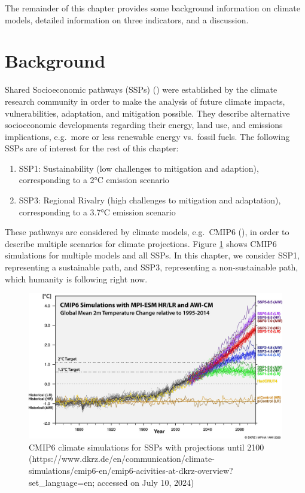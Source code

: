 \documentclass[
]{krantz}
\providecommand{\tightlist}{%
  \setlength{\itemsep}{0pt}\setlength{\parskip}{0pt}}
\begin{document}
The remainder of this chapter provides some background information on climate models, detailed information on three indicators, and a discussion.

\section{Background}\label{background}

Shared Socioeconomic pathways (SSPs) (\citet{riahi2017}) were established by the climate research community in order to make the analysis of future climate impacts, vulnerabilities, adaptation, and mitigation possible. They describe alternative socioeconomic developments regarding their energy, land use, and emissions implications, e.g.~more or less renewable energy vs.~fossil fuels. The following SSPs are of interest for the rest of this chapter:

\begin{enumerate}
\tightlist
\item
  SSP1: Sustainability (low challenges to mitigation and adaption), corresponding to a 2°C emission scenario
\item
  SSP3: Regional Rivalry (high challenges to mitigation and adaptation), corresponding to a 3.7°C emission scenario
\end{enumerate}

These pathways are considered by climate models, e.g.~CMIP6 (\citet{eyring2016}), in order to describe multiple scenarios for climate projections. Figure \ref{fig:cmip6strobl} shows CMIP6 simulations for multiple models and all SSPs. In this chapter, we consider SSP1, representing a sustainable path, and SSP3, representing a non-sustainable path, which humanity is following right now.

\begin{figure}

{\centering \includegraphics[width=0.8\linewidth]{work/08-lancet/figures/cmip6} 

}

\caption{CMIP6 climate simulations for SSPs with projections until 2100 (https://www.dkrz.de/en/communication/climate-simulations/cmip6-en/cmip6-acivities-at-dkrz-overview?set\_language=en; accessed on July 10, 2024)}\label{fig:cmip6strobl}
\end{figure}
\end{document}
